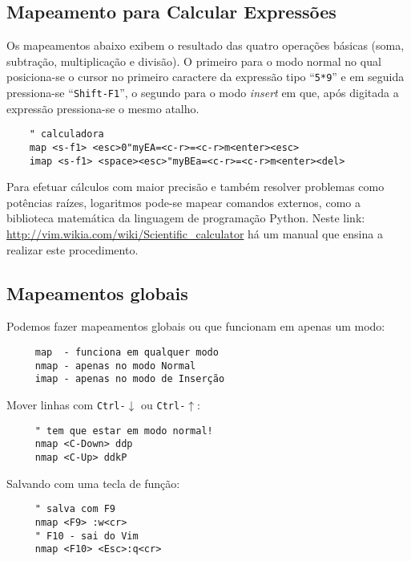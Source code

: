 \subsection{Mapeamento para Calcular Expressões}
\label{sub:Mapeamento para Calcular Expressões}

Os mapeamentos abaixo exibem o resultado das quatro operações básicas (soma,
subtração, multiplicação e divisão). O primeiro para o modo normal no qual
posiciona-se o cursor no primeiro caractere da expressão tipo ``{\tt 5*9}'' e em
seguida pressiona-se ``{\tt Shift-F1}'', o segundo para o modo {\em insert} em que, após
digitada a expressão pressiona-se o mesmo atalho.

\begin{verbatim}
    " calculadora
    map <s-f1> <esc>0"myEA=<c-r>=<c-r>m<enter><esc>
    imap <s-f1> <space><esc>"myBEa=<c-r>=<c-r>m<enter><del>
\end{verbatim}

Para efetuar cálculos com maior precisão e também resolver problemas como
potências raízes, logaritmos pode-se mapear comandos externos, como a
biblioteca matemática da linguagem de programação Python. Neste link:
\url{http://vim.wikia.com/wiki/Scientific_calculator} há um manual que ensina a
realizar este procedimento.


\subsection{Mapeamentos globais}


Podemos fazer mapeamentos globais ou que funcionam em apenas um modo:

\begin{verbatim}
     map  - funciona em qualquer modo
     nmap - apenas no modo Normal
     imap - apenas no modo de Inserção
\end{verbatim}

Mover linhas com {\tt Ctrl-$\downarrow$} ou {\tt Ctrl-$\uparrow$}:

\begin{verbatim}
     " tem que estar em modo normal!
     nmap <C-Down> ddp
     nmap <C-Up> ddkP
\end{verbatim}

Salvando com uma tecla de função:

\begin{verbatim}
     " salva com F9
     nmap <F9> :w<cr>
     " F10 - sai do Vim
     nmap <F10> <Esc>:q<cr>
\end{verbatim}

